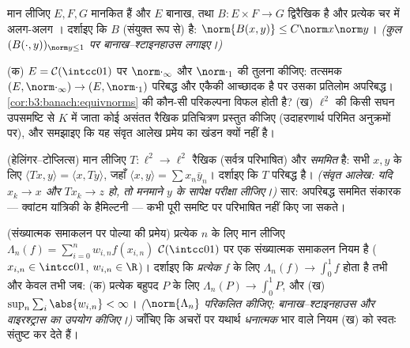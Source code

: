 \begin{exercise}[$\star\star$]\label{exo:b3:banach:6}
मान लीजिए $E, F, G$ मानकित हैं और $E$ बानाख, तथा $B \colon E \times
F \to G$ द्विरैखिक
है और प्रत्येक चर में अलग-अलग । दर्शाइए कि $B$ (संयुक्त
रूप से)  है: $\norm{B(x,y)} \leq
C\norm x\norm y$। \emph{(कुल $(B(\cdot, y))_{\norm y \leq 1}$ पर बानाख--श्टाइनहाउस
लगाइए।)}
\end{exercise}

\begin{exercise}[$\star\star$]\label{exo:b3:banach:7}
(क) $E = \mathcal C(\intcc01)$ पर $\norm\cdot_\infty$ और $\norm\cdot_1$ की तुलना कीजिए: तत्समक $(E, \norm\cdot_\infty) \to
(E, \norm\cdot_1)$ परिबद्ध
और एकैकी आच्छादक है पर उसका प्रतिलोम अपरिबद्ध। \cref{cor:b3:banach:equivnorms} की कौन-सी
परिकल्पना विफल होती है?
(ख) $\ell^2$ की किसी सघन उपसमष्टि से $K$ में जाता कोई असंतत रैखिक
प्रतिचित्रण प्रस्तुत कीजिए (उदाहरणार्थ परिमित अनुक्रमों पर), और
समझाइए कि यह संवृत आलेख प्रमेय का खंडन क्यों नहीं है।
\end{exercise}

\begin{exercise}[$\star\star\star$]\label{exo:b3:banach:8}
(हेलिंगर--टोप्लित्स) मान लीजिए $T \colon \ell^2 \to \ell^2$ रैखिक (सर्वत्र परिभाषित)
और \emph{सममित} है: सभी $x, y$ के लिए $\langle Tx,
y\rangle = \langle x, Ty\rangle$, जहाँ $\langle
x, y \rangle = \sum x_n\bar y_n$। दर्शाइए
कि $T$ परिबद्ध है। \emph{(संवृत आलेख: यदि $x_k \to x$ और $Tx_k \to z$ हो, तो
मनमाने $y$ के सापेक्ष परीक्षा लीजिए।)} सार: अपरिबद्ध सममित
संकारक --- क्वांटम यांत्रिकी के हैमिल्टनी --- कभी पूरी समष्टि पर
परिभाषित नहीं किए जा सकते।
\end{exercise}

\begin{exercise}[$\star\star\star$]\label{exo:b3:banach:9}
(संख्यात्मक समाकलन पर पोल्या की प्रमेय) प्रत्येक $n$ के लिए मान
लीजिए $\Lambda_n(f)
= \sum_{i=0}^{n} w_{i,n}f(x_{i,n})$ $\mathcal C(\intcc01)$ पर एक संख्यात्मक समाकलन नियम है ($x_{i,n} \in \intcc01$, $w_{i,n} \in
\R$)।
दर्शाइए कि \emph{प्रत्येक}  $f$ के लिए $\Lambda_n(f) \to \int_0^1f$ होता है तभी
और केवल तभी जब: (क) प्रत्येक बहुपद $P$ के लिए $\Lambda_n(P) \to \int_0^1P$, और (ख)
$\sup_n\sum_i\abs{w_{i,n}} <
\infty$। \emph{($\norm{\Lambda_n}$ परिकलित कीजिए; बानाख--श्टाइनहाउस और
वाइरश्ट्रास का उपयोग कीजिए।)} जाँचिए कि अचरों पर यथार्थ
\emph{धनात्मक} भार वाले नियम (ख) को स्वतः संतुष्ट कर देते हैं।
\end{exercise}

